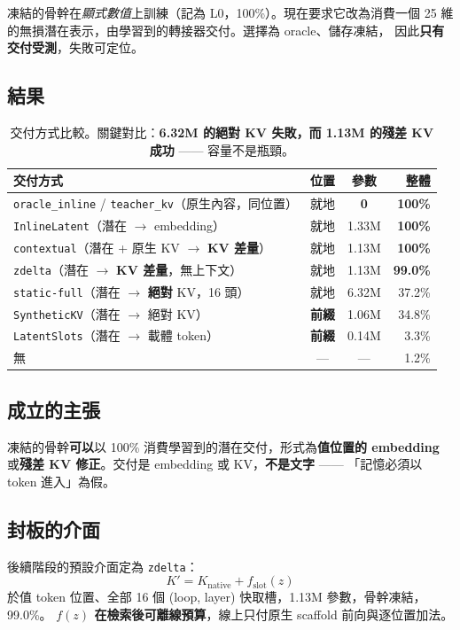 \documentclass[11pt, a4paper]{article}
\begin{document}
凍結的骨幹在\emph{顯式數值}上訓練（記為 L0，100\%）。現在要求它改為消費一個
25 維的無損潛在表示，由學習到的轉接器交付。選擇為 oracle、儲存凍結，
因此\textbf{只有交付受測}，失敗可定位。

\subsection{結果}

\begin{table}[h]
\centering
\small
\begin{tabular}{lccr}
\toprule
交付方式 & 位置 & 參數 & 整體 \\
\midrule
\verb|oracle_inline| / \verb|teacher_kv|（原生內容，同位置）& 就地 & \textbf{0} & \textbf{100\%} \\
\verb|InlineLatent|（潛在 $\to$ embedding）& 就地 & 1.33M & \textbf{100\%} \\
\verb|contextual|（潛在 + 原生 KV $\to$ \textbf{KV 差量}）& 就地 & 1.13M & \textbf{100\%} \\
\verb|zdelta|（潛在 $\to$ \textbf{KV 差量}，無上下文）& 就地 & 1.13M & \textbf{99.0\%} \\
\verb|static-full|（潛在 $\to$ \textbf{絕對} KV，16 頭）& 就地 & 6.32M & 37.2\% \\
\verb|SyntheticKV|（潛在 $\to$ 絕對 KV）& \textbf{前綴} & 1.06M & 34.8\% \\
\verb|LatentSlots|（潛在 $\to$ 載體 token）& \textbf{前綴} & 0.14M & 3.3\% \\
無 & --- & --- & 1.2\% \\
\bottomrule
\end{tabular}
\caption{交付方式比較。關鍵對比：\textbf{6.32M 的絕對 KV 失敗，而 1.13M 的殘差 KV 成功} ——
容量不是瓶頸。}
\end{table}

\subsection{成立的主張}

凍結的骨幹\textbf{可以}以 100\% 消費學習到的潛在交付，形式為\textbf{值位置的 embedding}
或\textbf{殘差 KV 修正}。交付是 embedding 或 KV，\textbf{不是文字} ——
「記憶必須以 token 進入」為假。

\subsection{封板的介面}

後續階段的預設介面定為 \verb|zdelta|：
\[
K' = K_{\text{native}} + f_{\text{slot}}(z)
\]
於值 token 位置、全部 16 個 (loop, layer) 快取槽，1.13M 參數，骨幹凍結，99.0\%。
\textbf{$f(z)$ 在檢索後可離線預算}，線上只付原生 scaffold 前向與逐位置加法。
\end{document}
